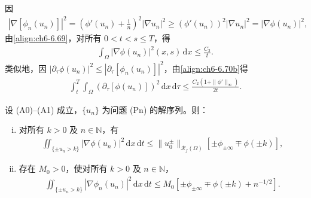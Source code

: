 \documentclass[../../main.tex]{subfiles}%
\begin{document}
\begin{remark}\label{remark:ch06-6.5.3}
因
\begin{align*}
|\nabla[\phi_n(u_n)]|^2=\left(\phi'(u_n)+\frac{1}{n}\right)^2|\nabla u_n|^2
\geqslant(\phi'(u_n))^2|\nabla u_n|^2=|\nabla\phi(u_n)|^2,
\end{align*}
由\eqref{align:ch6-6.69}，对所有 $0<t<s\leqslant T$，得
\begin{align}
\int_\Omega|\nabla\phi(u_n)|^2(x,s)\,\mathrm{d}x\leqslant\frac{C_2}{t}. \label{align:ch6-6.72}
\end{align}
类似地，因 $|\partial_\tau\phi(u_n)|^2\leqslant|\partial_\tau[\phi_n(u_n)]|^2$，由\eqref{align:ch6-6.70b}得
\begin{align}
\int_t^T\int_\Omega(\partial_\tau[\phi(u_n)])^2\,\mathrm{d}x\,\mathrm{d}\tau
\leqslant\frac{C_2(1+\|\phi'\|_\infty)}{2t}. \label{align:ch6-6.73}
\end{align}
\end{remark}

\begin{lemma}\label{lemma:ch06-6.5.8}
设 (A0)--(A1) 成立，$\{u_n\}$ 为问题 (Pn) 的解序列。则：
\begin{enumerate}[(i)]
\item 对所有 $k>0$ 及 $n\in\mathbb{N}$，有
\begin{align}
\iint_{\{\pm u_n>k\}}|\nabla\phi(u_n)|^2\,\mathrm{d}x\,\mathrm{d}t
\leqslant\|u^\pm_0\|_{\mathscr{R}_f(\Omega)}[\pm\phi_{\pm\infty}\mp\phi(\pm k)], \label{align:ch6-6.74}
\end{align}
\item 存在 $M_0>0$，使对所有 $k>0$ 及 $n\in\mathbb{N}$，
\begin{align}
\iint_{\{\pm u_n>k\}}|\nabla\phi_n(u_n)|^2\,\mathrm{d}x\,\mathrm{d}t
\leqslant M_0[\pm\phi_{\pm\infty}\mp\phi(\pm k)+n^{-1/2}]. \label{align:ch6-6.75}
\end{align}
\end{enumerate}
\end{lemma}
\end{document}

